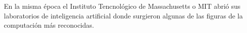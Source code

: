 En la misma época el Instituto Tencnológico de Massachusetts o MIT abrió sus laboratorios de inteligencia artificial donde surgieron algunas de las figuras de la computación más reconocidas.
